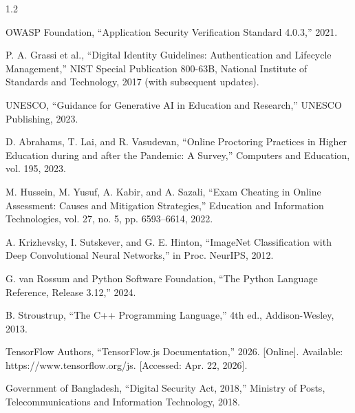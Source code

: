 \documentclass[12pt, a4paper]{report}
\begin{document}
\begin{spacing}{1.2}
\begin{list}{}{
    \setlength{\leftmargin}{0.31in}
    \setlength{\itemindent}{-0.31in}
    \setlength{\topsep}{0pt}
    \setlength{\itemsep}{6pt}
    \setlength{\parsep}{0pt}
  }
    \item[11.] OWASP Foundation, ``Application Security Verification Standard 4.0.3,'' 2021.

    \item[12.] P. A. Grassi et al., ``Digital Identity Guidelines: Authentication and Lifecycle Management,'' NIST Special Publication 800-63B, National Institute of Standards and Technology, 2017 (with subsequent updates).

    \item[13.] UNESCO, ``Guidance for Generative AI in Education and Research,'' UNESCO Publishing, 2023.

    \item[14.] D. Abrahams, T. Lai, and R. Vasudevan, ``Online Proctoring Practices in Higher Education during and after the Pandemic: A Survey,'' Computers and Education, vol. 195, 2023.

    \item[15.] M. Hussein, M. Yusuf, A. Kabir, and A. Sazali, ``Exam Cheating in Online Assessment: Causes and Mitigation Strategies,'' Education and Information Technologies, vol. 27, no. 5, pp. 6593--6614, 2022.

    \item[16.] A. Krizhevsky, I. Sutskever, and G. E. Hinton, ``ImageNet Classification with Deep Convolutional Neural Networks,'' in Proc. NeurIPS, 2012.

    \item[17.] G. van Rossum and Python Software Foundation, ``The Python Language Reference, Release 3.12,'' 2024.

    \item[18.] B. Stroustrup, ``The C++ Programming Language,'' 4th ed., Addison-Wesley, 2013.

    \item[19.] TensorFlow Authors, ``TensorFlow.js Documentation,'' 2026. [Online]. Available: https://www.tensorflow.org/js. [Accessed: Apr. 22, 2026].

    \item[20.] Government of Bangladesh, ``Digital Security Act, 2018,'' Ministry of Posts, Telecommunications and Information Technology, 2018.

  \end{list}
\end{spacing}
\end{document}
